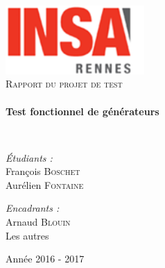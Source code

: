 \begin{titlepage}
		\begin{sffamily}
			\begin{center}

				\includegraphics[width=150pt]{images/logo_INSA.png}~\\[2.5cm]

				\textsc{\huge Rapport du projet de test}\\[2.5cm]

				\HRule \\[0.4cm]
				{ \huge \bfseries Test fonctionnel de générateurs\\[0.4cm] }

				\HRule \\[4cm]

				\begin{minipage}{0.4\textwidth}
					\begin{flushleft} \large
						\emph{Étudiants :}\\
						François \textsc{Boschet}\\
						Aurélien \textsc{Fontaine}
					\end{flushleft}
				\end{minipage}
				\begin{minipage}{0.5\textwidth}
					\begin{flushright} \large
						\emph{Encadrants :} \\
						Arnaud \textsc{Blouin}\\
						Les autres
					\end{flushright}
				\end{minipage}

				\vfill

				{\large Année 2016 - 2017}

			\end{center}
		\end{sffamily}
	\end{titlepage}
